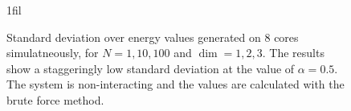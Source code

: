 \documentclass[
]{article}
\makeatletter
\newcommand*{\centerfloat}{%
  \parindent \z@
  \leftskip \z@ \@plus 1fil \@minus \textwidth
  \rightskip\leftskip
  \parfillskip \z@skip}
\makeatother
\begin{document}
\begin{figure}[ht]%
  \centerfloat
  \captionsetup[subfigure]{labelformat=empty}
  \\
  \caption{Standard deviation over energy values generated on 8 cores simulatneously, for $N=1,10,100$ and $\dim=1,2,3$. The results show a staggeringly low standard deviation at the value of $\alpha = 0.5$. The system is non-interacting and the values are calculated with the brute force method.}
  \label{fig:optimal_alpha_std}
\end{figure}
\end{document}
